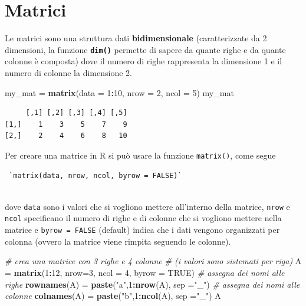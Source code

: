 \documentclass[
  a4paper,
  DIV=11,
  numbers=noendperiod]{scrreprt}
\newenvironment{Shaded}{\begin{snugshade}}{\end{snugshade}}
\newcommand{\AttributeTok}[1]{\textcolor[rgb]{0.13,0.29,0.53}{#1}}
\newcommand{\CommentTok}[1]{\textcolor[rgb]{0.56,0.35,0.01}{\textit{#1}}}
\newcommand{\ConstantTok}[1]{\textcolor[rgb]{0.56,0.35,0.01}{#1}}
\newcommand{\DecValTok}[1]{\textcolor[rgb]{0.00,0.00,0.81}{#1}}
\newcommand{\FunctionTok}[1]{\textcolor[rgb]{0.13,0.29,0.53}{\textbf{#1}}}
\newcommand{\NormalTok}[1]{#1}
\newcommand{\OtherTok}[1]{\textcolor[rgb]{0.56,0.35,0.01}{#1}}
\newcommand{\SpecialCharTok}[1]{\textcolor[rgb]{0.81,0.36,0.00}{\textbf{#1}}}
\newcommand{\StringTok}[1]{\textcolor[rgb]{0.31,0.60,0.02}{#1}}
\begin{document}
\section{Matrici}\label{matrici}

Le matrici sono una struttura dati \textbf{bidimensionale}
(caratterizzate da 2 dimensioni, la funzione \textbf{\texttt{dim()}}
permette di sapere da quante righe e da quante colonne è composta) dove
il numero di righe rappresenta la dimensione 1 e il numero di colonne la
dimensione 2.

\begin{Shaded}
\begin{Highlighting}[]
\NormalTok{my\_mat }\OtherTok{=} \FunctionTok{matrix}\NormalTok{(}\AttributeTok{data =} \DecValTok{1}\SpecialCharTok{:}\DecValTok{10}\NormalTok{, }\AttributeTok{nrow =} \DecValTok{2}\NormalTok{, }\AttributeTok{ncol =} \DecValTok{5}\NormalTok{)}
\NormalTok{my\_mat}
\end{Highlighting}
\end{Shaded}

\begin{verbatim}
     [,1] [,2] [,3] [,4] [,5]
[1,]    1    3    5    7    9
[2,]    2    4    6    8   10
\end{verbatim}

Per creare una matrice in R si può usare la funzione \texttt{matrix()},
come segue

\begin{verbatim}
 `matrix(data, nrow, ncol, byrow = FALSE)`
 
\end{verbatim}

dove \texttt{data} sono i valori che si vogliono mettere all'interno
della matrice, \texttt{nrow} e \texttt{ncol} specificano il numero di
righe e di colonne che si vogliono mettere nella matrice e
\texttt{byrow\ =\ FALSE} (default) indica che i dati vengono organizzati
per colonna (ovvero la matrice viene rimpita seguendo le colonne).

\begin{Shaded}
\begin{Highlighting}[]
\CommentTok{\# crea una matrice con 3 righe e 4 colonne }
\CommentTok{\# (i valori sono sistemati per riga)}
\NormalTok{A }\OtherTok{=} \FunctionTok{matrix}\NormalTok{(}\DecValTok{1}\SpecialCharTok{:}\DecValTok{12}\NormalTok{, }\AttributeTok{nrow=}\DecValTok{3}\NormalTok{, }\AttributeTok{ncol =} \DecValTok{4}\NormalTok{, }\AttributeTok{byrow =} \ConstantTok{TRUE}\NormalTok{)}
\CommentTok{\# assegna dei nomi alle righe }
\FunctionTok{rownames}\NormalTok{(A) }\OtherTok{=} \FunctionTok{paste}\NormalTok{(}\StringTok{"a"}\NormalTok{,}\DecValTok{1}\SpecialCharTok{:}\FunctionTok{nrow}\NormalTok{(A), }\AttributeTok{sep =}\StringTok{"\_"}\NormalTok{) }
\CommentTok{\# assegna dei nomi alle colonne}
\FunctionTok{colnames}\NormalTok{(A) }\OtherTok{=} \FunctionTok{paste}\NormalTok{(}\StringTok{"b"}\NormalTok{,}\DecValTok{1}\SpecialCharTok{:}\FunctionTok{ncol}\NormalTok{(A), }\AttributeTok{sep =}\StringTok{"\_"}\NormalTok{)}
\NormalTok{A}
\end{Highlighting}
\end{Shaded}
\end{document}
